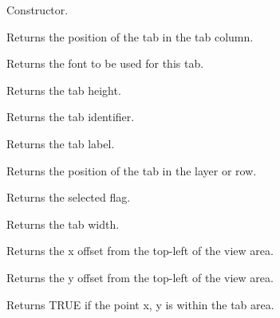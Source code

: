 Constructor.



Returns the position of the tab in the tab column.



Returns the font to be used for this tab.



Returns the tab height.



Returns the tab identifier.



Returns the tab label.



Returns the position of the tab in the layer or row.



Returns the selected flag.



Returns the tab width.



Returns the x offset from the top-left of the view area.



Returns the y offset from the top-left of the view area.



Returns TRUE if the point x, y is within the tab area.


